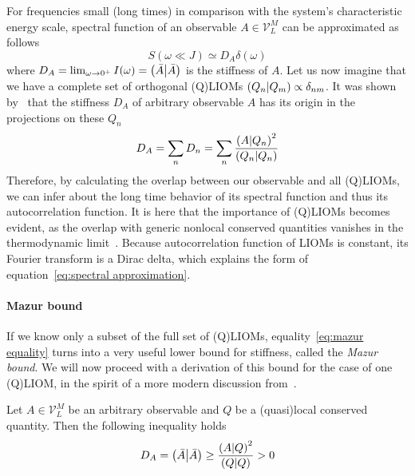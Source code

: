 For frequencies small (long times) in comparison with the system's characteristic energy
scale, spectral function of an observable \(A \in \mathcal{V}_L^M\) can be approximated as follows
\begin{equation}
  S(\omega \ll  J) \simeq  D_{A} \delta(\omega)
  \label{eq:spectral approximation}
\end{equation}
where \(D_A = \lim_{\omega\to 0^+} I(\omega) = \left(\bar{A} \middle| \bar{A}\right)\) is the stiffness of \(A\).
Let us now imagine that we have a complete set of orthogonal (Q)LIOMs 
\(\left(Q_{n} \middle| Q_{m}\right) \propto \delta_{nm}\). It was shown 
by~\textcite{Mazur1969,Suzuki1971} that the stiffness \(D_{A}\) of arbitrary observable \(A\) has its origin
in the projections on these \(Q_{n}\)
\begin{equation}
  D_A = \sum_{n} D_{n} = \sum_{n} \frac{\left(A \middle| Q_{n}\right)^2}
  {\left(Q_{n} \middle| Q_{n}\right)}
  \label{eq:mazur equality}
\end{equation}
Therefore, by calculating the overlap between our observable and all (Q)LIOMs, we can infer about the long time
behavior of its spectral function and thus its autocorrelation function. It is here that the
importance of (Q)LIOMs becomes evident, as the overlap with generic nonlocal conserved quantities
vanishes in the thermodynamic limit~\autocite{Zotos1997}.
Because autocorrelation function of
LIOMs is constant, its Fourier transform is a Dirac delta, which explains the form of 
equation~\eqref{eq:spectral approximation}. 

\paragraph{Mazur bound} If we know only a subset of the full set of (Q)LIOMs, 
equality~\eqref{eq:mazur equality} turns into 
a very useful lower bound for stiffness, called the \textit{Mazur bound}. We will now proceed with a derivation
of this bound for the case of one (Q)LIOM, in the spirit of a more modern discussion from~\textcite{Ilievski2016a}.
\begin{proposition}
  Let \(A\in \mathcal{V}_L^M\) be an arbitrary observable and \(Q\) be a (quasi)local conserved quantity. Then the following inequality
  holds
  \begin{equation*}
    D_{A} = \left(\bar{A} \middle| \bar{A}\right) \geq \frac{\left(A \middle| Q\right)^2}{\left(Q \middle| Q\right)} > 0
  \end{equation*}
  \label{prop:single mazur}
\end{proposition}

